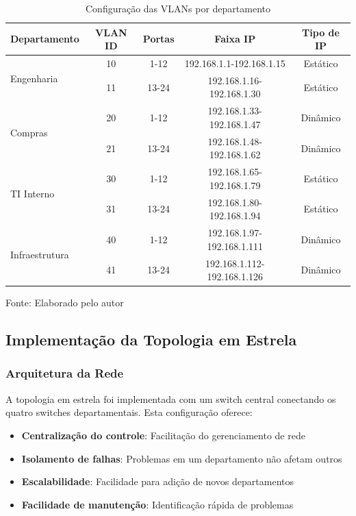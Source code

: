 \begin{table}[H]
\centering
\caption{Configuração das VLANs por departamento}
\begin{tabular}{|l|c|c|c|c|}
\hline
\textbf{Departamento} & \textbf{VLAN ID} & \textbf{Portas} & \textbf{Faixa IP} & \textbf{Tipo de IP} \\
\hline
\multirow{2}{*}{Engenharia} & 10 & 1-12 & 192.168.1.1-192.168.1.15 & Estático \\
\cline{2-5}
& 11 & 13-24 & 192.168.1.16-192.168.1.30 & Estático \\
\hline
\multirow{2}{*}{Compras} & 20 & 1-12 & 192.168.1.33-192.168.1.47 & Dinâmico \\
\cline{2-5}
& 21 & 13-24 & 192.168.1.48-192.168.1.62 & Dinâmico \\
\hline
\multirow{2}{*}{TI Interno} & 30 & 1-12 & 192.168.1.65-192.168.1.79 & Estático \\
\cline{2-5}
& 31 & 13-24 & 192.168.1.80-192.168.1.94 & Estático \\
\hline
\multirow{2}{*}{Infraestrutura} & 40 & 1-12 & 192.168.1.97-192.168.1.111 & Dinâmico \\
\cline{2-5}
& 41 & 13-24 & 192.168.1.112-192.168.1.126 & Dinâmico \\
\hline
\end{tabular}

\label{tab:vlans_configuracao}
{\fontsize{10pt}{\baselineskip}\selectfont
Fonte: Elaborado pelo autor}
\end{table}


\subsection{Implementação da Topologia em Estrela}

\subsubsection{Arquitetura da Rede}

A topologia em estrela foi implementada com um switch central conectando os quatro switches departamentais. Esta configuração oferece:

\begin{itemize}
    \item \textbf{Centralização do controle}: Facilitação do gerenciamento de rede
    \item \textbf{Isolamento de falhas}: Problemas em um departamento não afetam outros
    \item \textbf{Escalabilidade}: Facilidade para adição de novos departamentos
    \item \textbf{Facilidade de manutenção}: Identificação rápida de problemas
\end{itemize}

